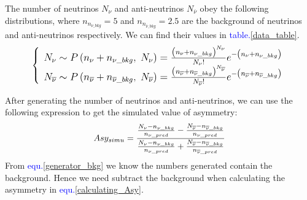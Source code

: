 \documentclass[a4paper,12pt]{article}
\begin{document}
The number of neutrinos $N_\nu$ and anti-neutrinos $N_{\overline\nu}$ obey the following distributions, where $n_{n_{\nu\_bkg}}=5$ and $n_{n_{\overline\nu\_bkg}}=2.5$ are the background of neutrinos and anti-neutrinos respectively. We can find their values in \textcolor{blue}{table.\ref{data_table}}.
\begin{equation}
\large
    \left\{\begin{array}{l}N_\nu\sim P\left(n_\nu+n_{\nu\_bkg},\;N_\nu\right)=\frac{\left(n_\nu+n_{\nu\_bkg}\right)^{N_\nu}}{N_\nu!}e^{-\left(n_\nu+n_{\nu\_bkg}\right)}\\N_{\overline\nu}\sim P\left(n_{\overline\nu}+n_{\overline\nu\_bkg},\;N_{\overline\nu}\right)=\frac{\left(n_{\overline\nu}+n_{\overline\nu\_bkg}\right)^{N_{\overline\nu}}}{N_{\overline\nu}!}e^{-\left(n_{\overline\nu}+n_{\overline\nu\_bkg}\right)}\end{array}\right.
    \label{generator_bkg}
\end{equation}

After generating the number of neutrinos and anti-neutrinos, we can use the following expression to get the simulated value of asymmetry:
\begin{equation}
\large
    Asy_{simu}=\frac{{\frac{N_\nu-n_{\nu\_bkg}}{n_{\nu\_pred}}}-\frac{N_{\overline\nu}-n_{\overline\nu\_bkg}}{n_{\nu\_pred}}}{\frac{N_\nu-n_{\nu\_bkg}}{n_{\nu\_pred}}+\frac{N_{\overline\nu}-n_{\overline\nu\_bkg}}{n_{\overline\nu\_pred}}}
    \label{calculating_Asy}
\end{equation}
From \textcolor{blue}{equ.\ref{generator_bkg}} we know the numbers generated contain the background. Hence we need subtract the background when calculating the asymmetry in \textcolor{blue}{equ.\ref{calculating_Asy}}.
\end{document}
